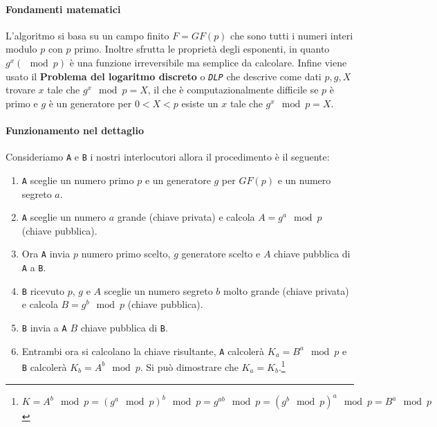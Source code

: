                 \paragraph{Fondamenti matematici} L'algoritmo si basa su un campo finito $ F = GF(p) $ che sono tutti i numeri interi modulo $ p $ con $ p $ primo. Inoltre sfrutta le proprietà degli esponenti, in quanto $ g^x(\mod p) $ è una funzione irreversibile ma semplice da calcolare. Infine viene usato il \textbf{Problema del logaritmo discreto} o \textit{\texttt{DLP}} che descrive come dati $ p,g,X $ trovare $ x $ tale che $ g^x \mod p = X $, il che è computazionalmente difficile se $ p $ è primo e $ g $ è un generatore per $ 0 < X < p $ esiste un $ x $ tale che $ g^x \mod p = X $.
                \paragraph{Funzionamento nel dettaglio} Consideriamo \texttt{A} e \texttt{B} i nostri interlocutori allora il procedimento è il seguente:
                \begin{enumerate}
                    \item \texttt{A} sceglie un numero primo $ p $ e un generatore $ g $ per $ GF(p) $ e un numero segreto $ a $.
                    \item \texttt{A} sceglie un numero $ a $ grande (chiave privata) e calcola $ A = g^a \mod p $ (chiave pubblica).
                    \item Ora \texttt{A} invia $ p $ numero primo scelto, $ g $ generatore scelto e $ A $ chiave pubblica di \texttt{A} a \texttt{B}.
                    \item \texttt{B} ricevuto $ p $, $ g $ e $ A $ sceglie un numero segreto $ b $ molto grande (chiave privata) e calcola $ B = g^b \mod p $ (chiave pubblica).
                    \item \texttt{B} invia a \texttt{A} $ B $ chiave pubblica di \texttt{B}.
                    \item Entrambi ora si calcolano la chiave risultante, \texttt{A} calcolerà $ K_a = B^a \mod p $ e \texttt{B} calcolerà $ K_b = A^b \mod p $. Si può dimostrare che $ K_a = K_b $.\footnote{$ K = A^b\mod p = (g^a \mod p)^b \mod p = g^{ab} \mod p = (g^b \mod p)^a \mod p = B^a \mod p $}
                \end{enumerate}
